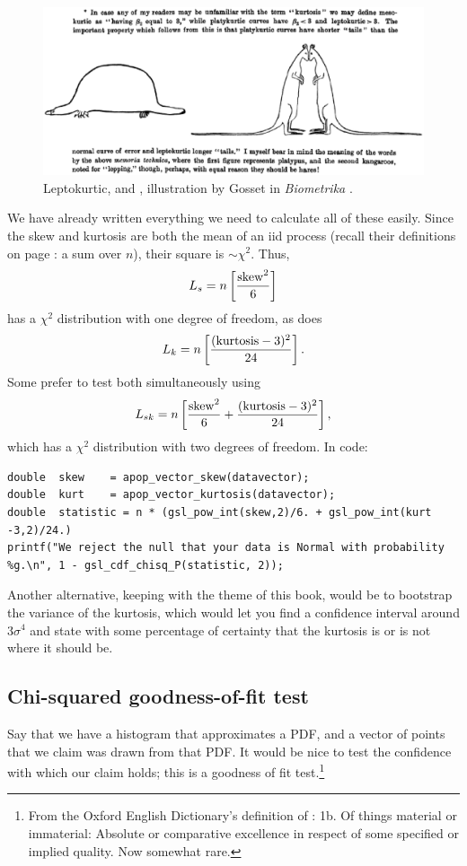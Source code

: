 \begin{figure}[tb]
\hspace{-.3in}\includegraphics[width=\textwidth*\real{1.1}]{kurtosis.eps}
\caption{Leptokurtic,  and , illustration by Gosset in {\em Biometrika} \citep[p 160]{student:errors}. }
\label{tailfig}
\end{figure}

We have already written everything we need to calculate all of these easily.
Since the skew and kurtosis are both the mean of an iid process (recall
their definitions on page \pageref{kurtskew}: a sum over $n$), their
square is $\sim \chi^2$. Thus,
$$L_s = n\left[{{\rm skew}^2\over 6}\right]$$
has a $\chi^2$ distribution with one degree of freedom, as does
$$L_k = n\left[{({\rm kurtosis}-3)^2\over 24}\right].$$
Some prefer to test both simultaneously using
$$L_{sk} = n\left[{{\rm skew}^2\over 6} + {({\rm kurtosis}-3)^2\over 24}\right],$$
which has a $\chi^2$ distribution with two degrees of freedom. In code:

\begin{lstlisting}
double  skew    = apop_vector_skew(datavector);
double  kurt    = apop_vector_kurtosis(datavector);
double  statistic = n * (gsl_pow_int(skew,2)/6. + gsl_pow_int(kurt -3,2)/24.)
printf("We reject the null that your data is Normal with probability %g.\n", 1 - gsl_cdf_chisq_P(statistic, 2));
\end{lstlisting}

Another alternative, keeping with the theme of this book, would be
to bootstrap the variance of the kurtosis, which would let you find a
confidence interval around $3 \sigma^4$ and state with some percentage
of certainty that the kurtosis is or is not where it should be.


\subsection{Chi-squared goodness-of-fit test} 
Say that we have a histogram that approximates a PDF, and a vector of
points that we claim was drawn from that PDF. It would be nice to test
the confidence with which our claim holds; this is a goodness
of fit test.\footnote{
From the Oxford English Dictionary's definition of :
    1b. Of things material or immaterial: Absolute or comparative
    excellence in respect of some specified or implied quality. Now
    somewhat rare.}

